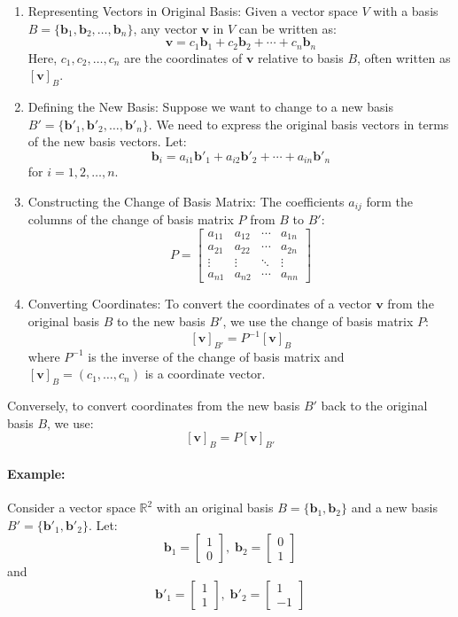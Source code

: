 \begin{enumerate}
	\item Representing Vectors in Original Basis: Given a vector space \( V \) with a basis \( B = \{\mathbf{b}_1, \mathbf{b}_2, \ldots, \mathbf{b}_n\} \), any vector \( \mathbf{v} \) in \( V \) can be written as:
\[ \mathbf{v} = c_1 \mathbf{b}_1 + c_2 \mathbf{b}_2 + \cdots + c_n \mathbf{b}_n \]
Here, \( c_1, c_2, \ldots, c_n \) are the coordinates of \( \mathbf{v} \) relative to basis \( B \), often written as \( [\mathbf{v}]_B \).
	\item Defining the New Basis: Suppose we want to change to a new basis \( B' = \{\mathbf{b}'_1, \mathbf{b}'_2, \ldots, \mathbf{b}'_n\} \). We need to express the original basis vectors in terms of the new basis vectors. Let:
\[ \mathbf{b}_i = a_{i1} \mathbf{b}'_1 + a_{i2} \mathbf{b}'_2 + \cdots + a_{in} \mathbf{b}'_n \]
for \( i = 1, 2, \ldots, n \).
	\item Constructing the Change of Basis Matrix:
The coefficients \( a_{ij} \) form the columns of the change of basis matrix \( P \) from \( B \) to \( B' \):
\[ P = \begin{bmatrix}
a_{11} & a_{12} & \cdots & a_{1n} \\
a_{21} & a_{22} & \cdots & a_{2n} \\
\vdots & \vdots & \ddots & \vdots \\
a_{n1} & a_{n2} & \cdots & a_{nn}
\end{bmatrix} \]
\item Converting Coordinates: To convert the coordinates of a vector \( \mathbf{v} \) from the original basis \( B \) to the new basis \( B' \), we use the change of basis matrix \( P \):
\[ [\mathbf{v}]_{B'} = P^{-1} [\mathbf{v}]_B \]
where \( P^{-1} \) is the inverse of the change of basis matrix and $[\mathbf{v}]_B = (c_1, \dots, c_n)$ is a coordinate vector.
\end{enumerate}

Conversely, to convert coordinates from the new basis \( B' \) back to the original basis \( B \), we use:
\[ [\mathbf{v}]_B = P [\mathbf{v}]_{B'} \]

\paragraph{Example:} Consider a vector space \( \mathbb{R}^2 \) with an original basis \( B = \{\mathbf{b}_1, \mathbf{b}_2\} \) and a new basis \( B' = \{\mathbf{b}'_1, \mathbf{b}'_2\} \). Let:
\[ \mathbf{b}_1 = \begin{bmatrix} 1 \\ 0 \end{bmatrix}, \; \mathbf{b}_2 = \begin{bmatrix} 0 \\ 1 \end{bmatrix} \]
and
\[ \mathbf{b}'_1 = \begin{bmatrix} 1 \\ 1 \end{bmatrix}, \; \mathbf{b}'_2 = \begin{bmatrix} 1 \\ -1 \end{bmatrix} \]

